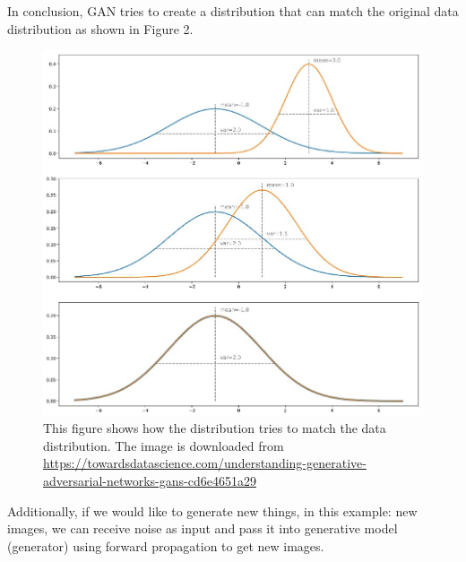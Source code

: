 \documentclass[10pt,twocolumn,letterpaper]{article}
\begin{document}
In conclusion, GAN tries to create a distribution that can match the original data distribution as shown in Figure 2.
\begin{figure}[htpb]
\begin{center}
   \includegraphics[width=1\linewidth, height=1.5\linewidth]{images/1_3XAUCz6o2DZlGHVsovvRIQ.jpeg}
\end{center}
   \caption{\footnotesize This figure shows how the distribution tries to match the data distribution. The image is downloaded from \href{https://towardsdatascience.com/understanding-generative-adversarial-networks-gans-cd6e4651a29}{https://towardsdatascience.com/understanding-generative-adversarial-networks-gans-cd6e4651a29}}
\end{figure}

Additionally, if we would like to generate new things, in this example: new images, we can receive noise as input and pass it into generative model (generator) using forward propagation to get new images. 
\end{document}

